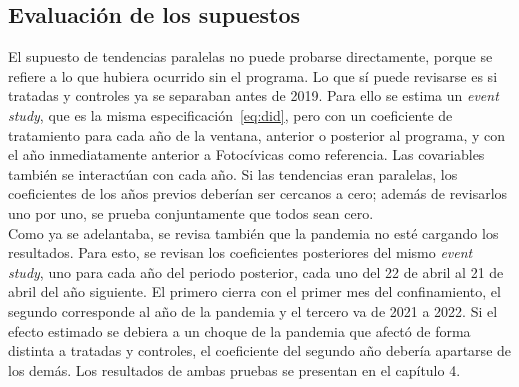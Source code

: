 \subsection{Evaluación de los supuestos}
\noindent El supuesto de tendencias paralelas no puede probarse directamente, porque se refiere a lo que hubiera ocurrido sin el programa. Lo que sí puede revisarse es si tratadas y controles ya se separaban antes de 2019. Para ello se estima un \emph{event study}, que es la misma especificación~\eqref{eq:did}, pero con un coeficiente de tratamiento para cada año de la ventana, anterior o posterior al programa, y con el año inmediatamente anterior a Fotocívicas como referencia. Las covariables también se interactúan con cada año. Si las tendencias eran paralelas, los coeficientes de los años previos deberían ser cercanos a cero; además de revisarlos uno por uno, se prueba conjuntamente que todos sean cero.\\

Como ya se adelantaba, se revisa también que la pandemia no esté cargando los resultados. Para esto, se revisan los coeficientes posteriores del mismo \emph{event study}, uno para cada año del periodo posterior, cada uno del 22 de abril al 21 de abril del año siguiente. El primero cierra con el primer mes del confinamiento, el segundo corresponde al año de la pandemia y el tercero va de 2021 a 2022. Si el efecto estimado se debiera a un choque de la pandemia que afectó de forma distinta a tratadas y controles, el coeficiente del segundo año debería apartarse de los demás. Los resultados de ambas pruebas se presentan en el capítulo 4.\\
